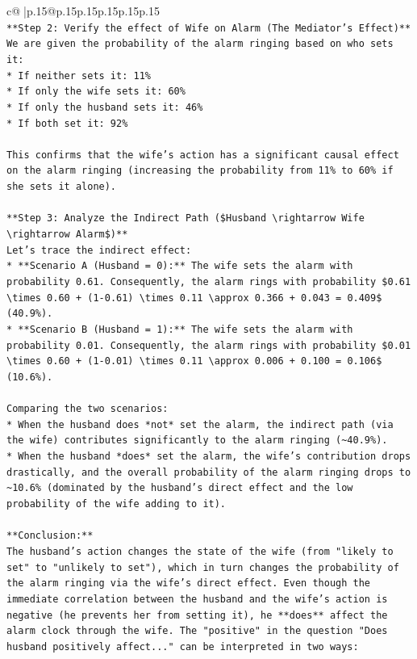 \documentclass{article}
\begin{document}
{\begin{supertabular}{c@{$\;$}|p{.15\linewidth}@{}p{.15\linewidth}p{.15\linewidth}p{.15\linewidth}p{.15\linewidth}p{.15\linewidth}}
{{{\\ 
\texttt{**Step 2: Verify the effect of Wife on Alarm (The Mediator's Effect)**} \\
\texttt{We are given the probability of the alarm ringing based on who sets it:} \\
\texttt{*   If neither sets it: 11\%} \\
\texttt{*   If only the wife sets it: 60\%} \\
\texttt{*   If only the husband sets it: 46\%} \\
\texttt{*   If both set it: 92\%} \\
\\ 
\texttt{This confirms that the wife's action has a significant causal effect on the alarm ringing (increasing the probability from 11\% to 60\% if she sets it alone).} \\
\\ 
\texttt{**Step 3: Analyze the Indirect Path (\$Husband \textbackslash{}rightarrow Wife \textbackslash{}rightarrow Alarm\$)**} \\
\texttt{Let's trace the indirect effect:} \\
\texttt{*   **Scenario A (Husband = 0):** The wife sets the alarm with probability 0.61. Consequently, the alarm rings with probability \$0.61 \textbackslash{}times 0.60 + (1{-}0.61) \textbackslash{}times 0.11 \textbackslash{}approx 0.366 + 0.043 = 0.409\$ (40.9\%).} \\
\texttt{*   **Scenario B (Husband = 1):** The wife sets the alarm with probability 0.01. Consequently, the alarm rings with probability \$0.01 \textbackslash{}times 0.60 + (1{-}0.01) \textbackslash{}times 0.11 \textbackslash{}approx 0.006 + 0.100 = 0.106\$ (10.6\%).} \\
\\ 
\texttt{Comparing the two scenarios:} \\
\texttt{*   When the husband does *not* set the alarm, the indirect path (via the wife) contributes significantly to the alarm ringing (\textasciitilde{}40.9\%).} \\
\texttt{*   When the husband *does* set the alarm, the wife's contribution drops drastically, and the overall probability of the alarm ringing drops to \textasciitilde{}10.6\% (dominated by the husband's direct effect and the low probability of the wife adding to it).} \\
\\ 
\texttt{**Conclusion:**} \\
\texttt{The husband's action changes the state of the wife (from "likely to set" to "unlikely to set"), which in turn changes the probability of the alarm ringing via the wife's direct effect. Even though the immediate correlation between the husband and the wife's action is negative (he prevents her from setting it), he **does** affect the alarm clock through the wife. The "positive" in the question "Does husband positively affect..." can be interpreted in two ways:} \\
}}}
\end{supertabular}}
\end{document}
